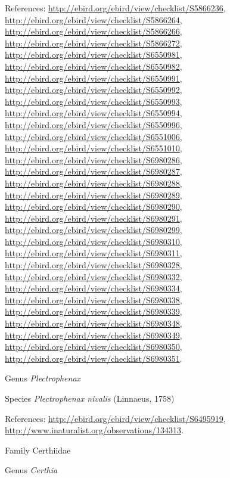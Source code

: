 \documentclass[9pt, article]{memoir}
\begin{document}
\begin{multicols}{2}
\vspace{6pt}References: 
\url{http://ebird.org/ebird/view/checklist/S5866236}, 
\url{http://ebird.org/ebird/view/checklist/S5866264}, 
\url{http://ebird.org/ebird/view/checklist/S5866266}, 
\url{http://ebird.org/ebird/view/checklist/S5866272}, 
\url{http://ebird.org/ebird/view/checklist/S6550981}, 
\url{http://ebird.org/ebird/view/checklist/S6550982}, 
\url{http://ebird.org/ebird/view/checklist/S6550991}, 
\url{http://ebird.org/ebird/view/checklist/S6550992}, 
\url{http://ebird.org/ebird/view/checklist/S6550993}, 
\url{http://ebird.org/ebird/view/checklist/S6550994}, 
\url{http://ebird.org/ebird/view/checklist/S6550996}, 
\url{http://ebird.org/ebird/view/checklist/S6551006}, 
\url{http://ebird.org/ebird/view/checklist/S6551010}, 
\url{http://ebird.org/ebird/view/checklist/S6980286}, 
\url{http://ebird.org/ebird/view/checklist/S6980287}, 
\url{http://ebird.org/ebird/view/checklist/S6980288}, 
\url{http://ebird.org/ebird/view/checklist/S6980289}, 
\url{http://ebird.org/ebird/view/checklist/S6980290}, 
\url{http://ebird.org/ebird/view/checklist/S6980291}, 
\url{http://ebird.org/ebird/view/checklist/S6980299}, 
\url{http://ebird.org/ebird/view/checklist/S6980310}, 
\url{http://ebird.org/ebird/view/checklist/S6980311}, 
\url{http://ebird.org/ebird/view/checklist/S6980328}, 
\url{http://ebird.org/ebird/view/checklist/S6980332}, 
\url{http://ebird.org/ebird/view/checklist/S6980334}, 
\url{http://ebird.org/ebird/view/checklist/S6980338}, 
\url{http://ebird.org/ebird/view/checklist/S6980339}, 
\url{http://ebird.org/ebird/view/checklist/S6980348}, 
\url{http://ebird.org/ebird/view/checklist/S6980349}, 
\url{http://ebird.org/ebird/view/checklist/S6980350}, 
\url{http://ebird.org/ebird/view/checklist/S6980351}.

\vspace{6pt}\noindent\hspace{30pt}Genus \textit{Plectrophenax}


\vspace{6pt}\noindent\hspace{36pt}Species \textit{Plectrophenax nivalis} (Linnaeus, 1758)


\vspace{6pt}References: 
\url{http://ebird.org/ebird/view/checklist/S6495919}, 
\url{http://www.inaturalist.org/observations/134313}.

\vspace{6pt}\noindent\hspace{24pt}Family Certhiidae


\vspace{6pt}\noindent\hspace{30pt}Genus \textit{Certhia}



\end{multicols}
\end{document}
